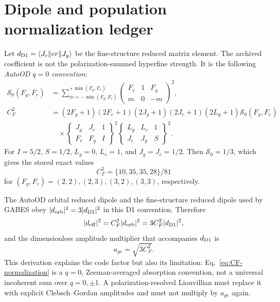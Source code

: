 \documentclass[11pt,a4paper]{article}
\begin{document}
\section{Dipole and population normalization ledger}
\label{app:normalization}

Let $d_{\rm D1}=\langle J_e\|er\|J_g\rangle$ be the fine-structure reduced
matrix element. The archived coefficient is not the polarization-summed
hyperfine strength. It is the following \emph{AutoOD $q=0$ convention}:
\begin{align}
\mathcal S_0(F_g,F_e)
&=\sum_{m=-\min(F_g,F_e)}^{+\min(F_g,F_e)}
\begin{pmatrix}F_e&1&F_g\\m&0&-m\end{pmatrix}^{\!2},\\
C_F^2&=(2F_g+1)(2F_e+1)(2J_g+1)(2J_e+1)(2L_g+1)
\mathcal S_0(F_g,F_e)\nonumber\\
&\quad\times
\begin{Bmatrix}J_g&J_e&1\\F_e&F_g&I\end{Bmatrix}^{\!2}
\begin{Bmatrix}L_g&L_e&1\\J_e&J_g&S\end{Bmatrix}^{\!2}.
\label{eq:CF-normalization}
\end{align}
For $I=5/2$, $S=1/2$, $L_g=0$, $L_e=1$, and
$J_g=J_e=1/2$. Then $\mathcal S_0=1/3$, which gives the stored exact values
\[
C_F^2=\{10,35,35,28\}/81
\]
for $(F_g,F_e)=(2,2),(2,3),(3,2),(3,3)$, respectively.

The AutoOD orbital reduced dipole and the fine-structure reduced dipole used
by GABES obey $|d_{\rm orb}|^2=3|d_{\rm D1}|^2$ in this D1 convention.
Therefore
\[
|d_{\rm eff}|^2=C_F^2|d_{\rm orb}|^2
=3C_F^2|d_{\rm D1}|^2,
\]
and the dimensionless amplitude multiplier that accompanies
$d_{\rm D1}$ is
\begin{equation}
a_{ge}=\sqrt{3C_F^2}.
\label{eq:age-normalization}
\end{equation}
This derivation explains the code factor but also its limitation:
Eq.~\eqref{eq:CF-normalization} is a $q=0$, Zeeman-averaged absorption
convention, not a universal incoherent sum over $q=0,\pm1$. A
polarization-resolved Liouvillian must replace it with explicit
Clebsch--Gordan amplitudes and must not multiply by $a_{ge}$ again.
\end{document}
